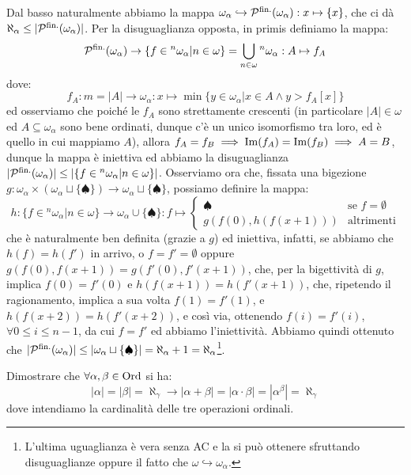 \begin{soln}
	Dal basso naturalmente abbiamo la mappa $\omega_\alpha \hookrightarrow \mathcal{P}^{\text{fin.}}(\omega_\alpha) : x \mapsto \{x\}$, che ci dà $\aleph_\alpha \leq |\mathcal{P}^{\text{fin.}}(\omega_\alpha)|$. Per la disuguaglianza opposta, in primis definiamo la mappa:
	\[ \mathcal{P}^{\text{fin.}}(\omega_\alpha) \to \{f \in {}^n \omega_\alpha | n \in \omega\} = \bigcup_{n \in \omega} {}^n\omega_\alpha : A \mapsto f_A
		\]
	dove:
	\[ f_A : m = |A| \to \omega_\alpha : x \mapsto \min\{y \in \omega_\alpha | x \in  A \land y > f_A[x]\}
		\]
	ed osserviamo che poiché le $f_A$ sono strettamente crescenti (in particolare $|A| \in \omega$ ed $A \subseteq \omega_\alpha$ sono bene ordinati, dunque c'è un unico isomorfismo tra loro, ed è quello in cui mappiamo $A$),
	allora $f_A = f_B \implies \operatorname{Im}(f_A) = \operatorname{Im}(f_B) \implies A = B$, dunque la mappa è iniettiva ed abbiamo la disuguaglianza $|\mathcal{P}^{\text{fin.}}(\omega_\alpha)| \leq |\{f \in {}^n \omega_\alpha | n \in \omega\}|$. Osserviamo ora che, fissata una
	bigezione $g : \omega_\alpha \times (\omega_\alpha \sqcup \{\spadesuit\}) \to \omega_\alpha \sqcup \{\spadesuit\}$, possiamo definire la mappa:
	\[ h : \{f \in {}^n \omega_\alpha | n \in \omega\} \to \omega_\alpha \cup \{\spadesuit\} : f \mapsto \begin{cases}
		\spadesuit &\text{se $f = \emptyset$} \\
		g(f(0),h(f(x + 1))) &\text{altrimenti}
	\end{cases}
		\]
	che è naturalmente ben definita (grazie a $g$) ed iniettiva, infatti, se abbiamo che $h(f) = h(f')$ in arrivo, o $f = f' = \emptyset$ oppure $g(f(0),f(x+1)) = g(f'(0),f'(x+1))$, che, per la bigettività di $g$, implica $f(0) = f'(0)$ e $h(f(x+1)) = h(f'(x+1))$, che, ripetendo il ragionamento,
	implica a sua volta $f(1) = f'(1)$, e $h(f(x+2)) = h(f'(x+2))$, e così via, ottenendo $f(i) = f'(i)$, $\forall 0 \leq i \leq n-1$, da cui $f = f'$ ed abbiamo l'iniettività. Abbiamo quindi ottenuto che $|\mathcal{P}^{\text{fin.}}(\omega_\alpha)| \leq |\omega_\alpha \sqcup \{\spadesuit\}| = \aleph_\alpha + 1 = \aleph_\alpha$\footnote{L'ultima
	uguaglianza è vera senza AC e la si può ottenere sfruttando disuguaglianze oppure il fatto che $\omega \hookrightarrow \omega_\alpha$.}.
\end{soln}

\begin{exercise}
	Dimostrare che $\forall \alpha,\beta \in \operatorname{Ord}$ si ha:
	\[ |\alpha| = |\beta| = \aleph_\gamma \to |\alpha + \beta| = |\alpha \cdot \beta| = |\alpha^{\beta}| = \aleph_\gamma 
		\]
	dove intendiamo la cardinalità delle tre operazioni ordinali.
\end{exercise}

